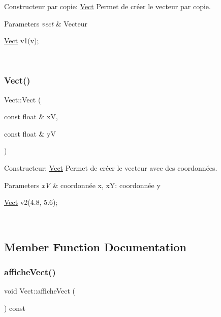 Constructeur par copie\+: \hyperlink{classVect}{Vect} Permet de créer le vecteur par copie. 


\begin{DoxyParams}{Parameters}
{\em vect} & Vecteur 
\begin{DoxyCode}
\hyperlink{classVect}{Vect} v1(v);
\end{DoxyCode}
 \\
\hline
\end{DoxyParams}
\mbox{\label{classVect_a12b53ecc7a5ba733c85bacc1c6deac28}} 
\subsubsection{\texorpdfstring{Vect()}{Vect()}\hspace{0.1cm}{\footnotesize\ttfamily [3/3]}}
{\footnotesize\ttfamily Vect\+::\+Vect (\begin{DoxyParamCaption}\item[{const float \&}]{xV,  }\item[{const float \&}]{yV }\end{DoxyParamCaption})}



Constructeur\+: \hyperlink{classVect}{Vect} Permet de créer le vecteur avec des coordonnées. 


\begin{DoxyParams}{Parameters}
{\em xV} & coordonnée x, xY\+: coordonnée y 
\begin{DoxyCode}
\hyperlink{classVect}{Vect} v2(4.8, 5.6);
\end{DoxyCode}
 \\
\hline
\end{DoxyParams}


\subsection{Member Function Documentation}
\mbox{\label{classVect_a11f0af5e83cd9c4605c37e0b98eff8c0}} 
\subsubsection{\texorpdfstring{affiche\+Vect()}{afficheVect()}}
{\footnotesize\ttfamily void Vect\+::affiche\+Vect (\begin{DoxyParamCaption}{ }\end{DoxyParamCaption}) const}



